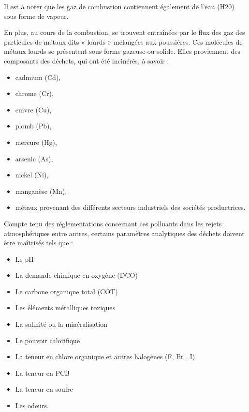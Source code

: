 Il est à noter que les gaz de combustion contiennent également de l’eau (H20) sous forme de vapeur.
\vspace{0.3cm}

En plus, au cours de la combustion, se trouvent entraînées par le flux des gaz des particules de métaux dits « lourds » mélangées aux poussières. Ces molécules de métaux lourds se présentent sous forme gazeuse ou solide. Elles proviennent des composants des déchets, qui ont été incinérés, à savoir :


\begin{itemize}
  
\item cadmium (Cd),
\item chrome (Cr),
\item cuivre (Cu),
\item plomb (Pb),
\item mercure (Hg),
\item arsenic (As),
\item nickel (Ni),
\item manganèse (Mn),
\item métaux provenant des différents secteurs industriels des sociétés productrices.
  
\end{itemize}

Compte tenu des réglementations concernant ces polluants dans les rejets atmosphériques entre autres, certains paramètres analytiques des déchets doivent être maîtrisés tels que :
\begin{itemize}
  
\item Le pH
\item La demande chimique en oxygène (DCO)
\item Le carbone organique total (COT)
\item Les éléments métalliques toxiques 
\item La salinité ou la minéralisation
\item Le pouvoir calorifique
\item La teneur en chlore organique et autres halogènes (F, Br , I)
\item La teneur en PCB
\item La teneur en soufre
\item Les odeurs.
\end{itemize}


